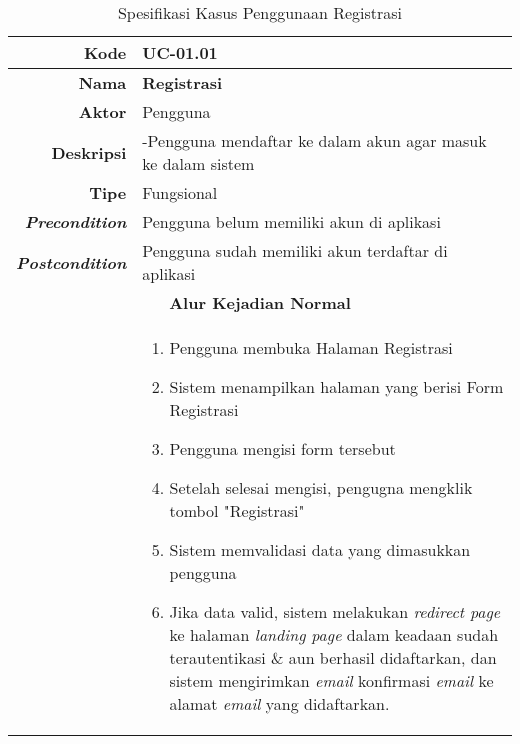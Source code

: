 \begin{table}[H]
	\centering
	\caption{Spesifikasi Kasus Penggunaan Registrasi}
	\label{uc01.01}
	\begin{tabular}{|r|p{8cm}|}
		\hline
		\textbf{Kode}                                                    & UC-01.01                                                     \\ \hline
		\textbf{Nama}                                                    & \textbf{Registrasi}                                         \\ \hline
		\textbf{Aktor}                                                   & Pengguna                                                    \\ \hline
		\textbf{Deskripsi}                                               & 
			-Pengguna mendaftar ke dalam akun agar masuk ke dalam sistem \\ \hline
		\textbf{Tipe}                                                    & Fungsional                                                  \\ \hline
		\textbf{\textit{Precondition}}
			& Pengguna belum memiliki akun di aplikasi                    \\ \hline
		\textbf{\textit{Postcondition}} 
			& Pengguna sudah memiliki akun terdaftar di aplikasi          \\ \hline
		\multicolumn{2}{|c|}{\textbf{Alur Kejadian Normal}}                                                                            \\ \hline
		\multicolumn{1}{|l|}{}                                           & 
			\begin{enumerate}
				\item Pengguna membuka Halaman Registrasi
				\item \label{uc0101-show1page}Sistem menampilkan halaman yang berisi Form Registrasi
				\item Pengguna mengisi form tersebut
				\item Setelah selesai mengisi, pengugna mengklik tombol "Registrasi"
				\item \label{al-0101-a} Sistem memvalidasi data yang dimasukkan pengguna
				\item Jika data valid, sistem melakukan \textit{redirect page} ke halaman \textit{landing page} dalam keadaan sudah terautentikasi \& aun berhasil didaftarkan, dan sistem mengirimkan \textit{email} konfirmasi \textit{email} ke alamat \textit{email} yang didaftarkan.
			\end{enumerate}

\end{tabular}
\end{table}

